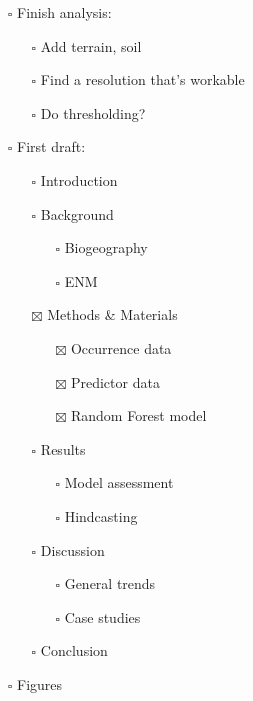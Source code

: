 \documentclass[
  number,
  review]{elsarticle}
\providecommand{\tightlist}{%
  \setlength{\itemsep}{0pt}\setlength{\parskip}{0pt}}\usepackage{longtable,booktabs,array}
\begin{document}
\begin{itemize}
\tightlist
\item[$\square$]
  Finish analysis:

  \begin{itemize}
  \tightlist
  \item[$\square$]
    Add terrain, soil
  \item[$\square$]
    Find a resolution that's workable
  \item[$\square$]
    Do thresholding?
  \end{itemize}
\item[$\square$]
  First draft:

  \begin{itemize}
  \tightlist
  \item[$\square$]
    Introduction
  \item[$\square$]
    Background

    \begin{itemize}
    \tightlist
    \item[$\square$]
      Biogeography
    \item[$\square$]
      ENM
    \end{itemize}
  \item[$\boxtimes$]
    Methods \& Materials

    \begin{itemize}
    \tightlist
    \item[$\boxtimes$]
      Occurrence data
    \item[$\boxtimes$]
      Predictor data
    \item[$\boxtimes$]
      Random Forest model
    \end{itemize}
  \item[$\square$]
    Results

    \begin{itemize}
    \tightlist
    \item[$\square$]
      Model assessment
    \item[$\square$]
      Hindcasting
    \end{itemize}
  \item[$\square$]
    Discussion

    \begin{itemize}
    \tightlist
    \item[$\square$]
      General trends
    \item[$\square$]
      Case studies
    \end{itemize}
  \item[$\square$]
    Conclusion
  \end{itemize}
\item[$\square$]
  Figures


\end{itemize}
\end{document}
